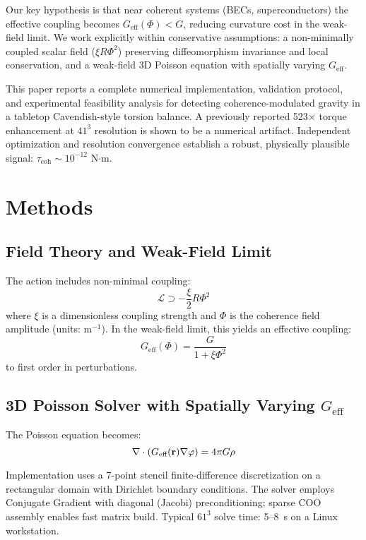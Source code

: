 \documentclass[10pt,twocolumn]{article}
\begin{document}
Our key hypothesis is that near coherent systems (BECs, superconductors) the effective coupling becomes $G_{\text{eff}}(\Phi) < G$, reducing curvature cost in the weak-field limit. We work explicitly within conservative assumptions: a non-minimally coupled scalar field ($\xi R \Phi^2$) preserving diffeomorphism invariance and local conservation, and a weak-field 3D Poisson equation with spatially varying $G_{\text{eff}}$.

This paper reports a complete numerical implementation, validation protocol, and experimental feasibility analysis for detecting coherence-modulated gravity in a tabletop Cavendish-style torsion balance. A previously reported 523$\times$ torque enhancement at $41^3$ resolution is shown to be a numerical artifact. Independent optimization and resolution convergence establish a robust, physically plausible signal: $\tau_{\text{coh}} \sim 10^{-12}$ N$\cdot$m.

\section{Methods}

\subsection{Field Theory and Weak-Field Limit}

The action includes non-minimal coupling:
\begin{equation}
\mathcal{L} \supset -\frac{\xi}{2} R \Phi^2
\end{equation}
where $\xi$ is a dimensionless coupling strength and $\Phi$ is the coherence field amplitude (units: m$^{-1}$). In the weak-field limit, this yields an effective coupling:
\begin{equation}
G_{\text{eff}}(\Phi) = \frac{G}{1 + \xi \Phi^2}
\end{equation}
to first order in perturbations.

\subsection{3D Poisson Solver with Spatially Varying $G_{\text{eff}}$}

The Poisson equation becomes:
\begin{equation}
\nabla \cdot (G_{\text{eff}}({\bf r}) \nabla \varphi) = 4\pi G \rho
\label{eq:poisson}
\end{equation}

Implementation uses a 7-point stencil finite-difference discretization on a rectangular domain with Dirichlet boundary conditions. The solver employs Conjugate Gradient with diagonal (Jacobi) preconditioning; sparse COO assembly enables fast matrix build. Typical $61^3$ solve time: 5--8~s on a Linux workstation.
\end{document}
